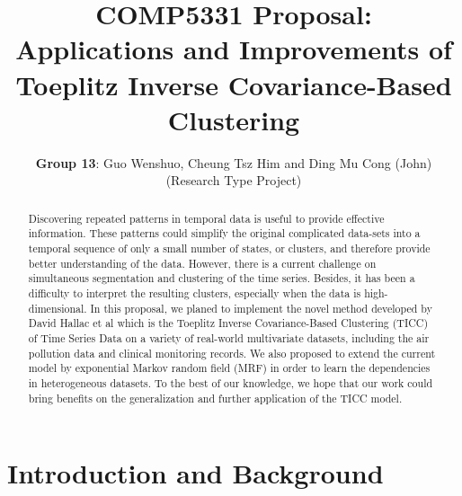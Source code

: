 \documentclass{llncs}
\begin{document}
%
\frontmatter          %
%
\pagestyle{headings}  %

\title{COMP5331 Proposal: \\ Applications and Improvements of Toeplitz Inverse Covariance-Based Clustering}
\author{{\bf Group 13}: Guo Wenshuo, Cheung Tsz Him and Ding Mu Cong (John)  (Research Type Project)}


\maketitle %

\begin{abstract}

Discovering repeated patterns in temporal data is useful to provide effective information. These patterns could simplify the original complicated data-sets into a temporal sequence of only a small number of states, or clusters, and therefore provide better understanding of the data. However, there is a current challenge on simultaneous segmentation and clustering of the time series. Besides, it has been a difficulty to interpret the resulting clusters, especially when the data is high-dimensional. In this proposal, we planed to implement the novel method developed by David Hallac et al \cite{tiic} which is the Toeplitz Inverse Covariance-Based Clustering (TICC) of Time Series Data on a variety of real-world multivariate datasets, including the air pollution data and clinical monitoring records. We also proposed to extend the current model by exponential Markov random field (MRF) in order to learn the dependencies in heterogeneous datasets. To the best of our knowledge, we hope that our work could bring benefits on the generalization and further application of the TICC model. 

\end{abstract}

\section{Introduction and Background}
\end{document}
